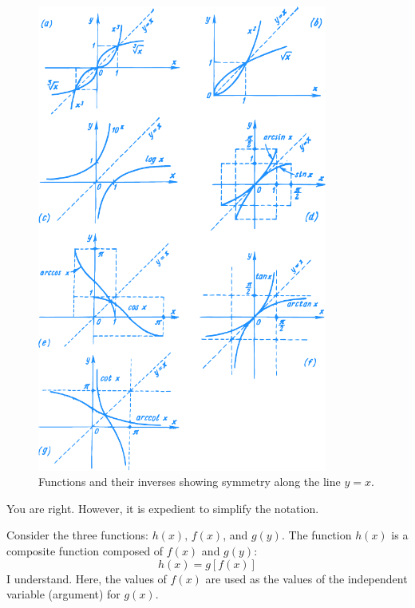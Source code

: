 {\begin{figure}[!ht]%
\centering
\includegraphics[width=0.85\textwidth]{figures/fig-20.pdf}
\caption{Functions and their inverses showing symmetry along the line $y=x$.}
\label{fig-20}
\end{figure}

\athr You are right. However, it is expedient to simplify the notation.

Consider the three functions: $h (x), \, f (x)$, and $g (y)$. The function $h (x)$ is a composite function composed of $f(x)$ and $g(y)$:
\begin{equation*}%
h (x) = g [f (x)] 
\end{equation*}
\rdr I understand. Here, the values of $f (x)$ are used as the values of the independent variable (argument) for $g (x)$.

}
